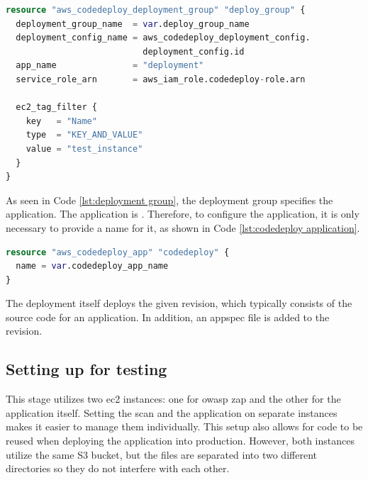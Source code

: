 \vspace{2mm}
\begin{lstlisting}[language=terraform, caption=Creation of the deployment group, captionpos=b, frame=single, label= {lst:deployment group}]
resource "aws_codedeploy_deployment_group" "deploy_group" {
  deployment_group_name  = var.deploy_group_name
  deployment_config_name = aws_codedeploy_deployment_config.
                           deployment_config.id
  app_name               = "deployment"
  service_role_arn       = aws_iam_role.codedeploy-role.arn

  ec2_tag_filter {
    key   = "Name"
    type  = "KEY_AND_VALUE"
    value = "test_instance"
  }
}
\end{lstlisting}
\newpage
As seen in Code \ref{lst:deployment group}, the deployment group specifies the application. The application is \textit{} \cite{CodeDeployApplication}. Therefore, to configure the application, it is only necessary to provide a name for it, as shown in Code \ref{lst:codedeploy application}.

\vspace{2mm}
\begin{lstlisting}[language=terraform, caption=Creation of an application for the deployment, captionpos=b, frame=single, label= lst:codedeploy application]
resource "aws_codedeploy_app" "codedeploy" {
  name = var.codedeploy_app_name
}
\end{lstlisting}

The deployment itself deploys the given revision, which typically consists of the source code for an application. In addition, an \gls{appspec} file is added to the revision. 

\subsection{Setting up for testing}

This stage utilizes two \acrshort{ec2} instances: one for \acrshort{owasp} \acrshort{zap} and the other for the application itself. Setting the scan and the application on separate instances makes it easier to manage them individually. This setup also allows for code to be reused when deploying the application into production. However, both instances utilize the same S3 bucket, but the files are separated into two different directories so they do not interfere with each other.

